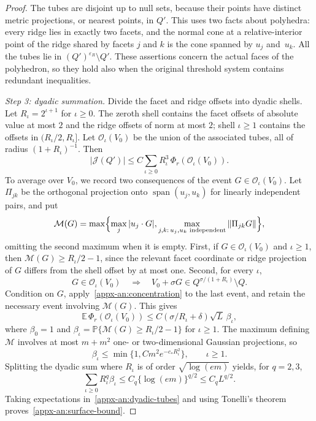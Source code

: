 \documentclass[11pt,letterpaper]{article}
\newif\ifshowrev
\newenvironment{revblock}{\ifshowrev\color{revblue}%
\hypersetup{linkcolor=revblue,citecolor=revblue,urlcolor=revblue}\fi}{}
\newif\ifshowpass
\newcommand{\pass}[1]{\ifshowpass{\color{revblue}%
\hypersetup{linkcolor=revblue,citecolor=revblue,urlcolor=revblue}#1}\else#1\fi}
\newif\ifshowskill
\newcommand{\sks}[1]{\ifshowskill{\color{revblue}#1}\else#1\fi}
\theoremstyle{remark}
\newcommand{\E}{\mathbb E}
\newcommand{\Pp}{\mathbb P}
\newcommand{\norm}[1]{\left\lVert#1\right\rVert}
\newcommand{\surf}{\mathcal J}
\begin{document}
\begin{revblock}
\begin{proof}
The tubes are disjoint up to null sets, because their points have
distinct metric projections, or nearest points, in \(Q'\). This uses two facts about
polyhedra: every ridge lies in exactly two facets, and the normal cone at
a relative-interior point of the ridge shared by facets \(j\) and \(k\) is
the cone spanned by \(u_j\) and~\(u_k\). All the tubes lie in
\((Q')^{\varepsilon_R}\setminus Q'\). These assertions concern the actual
faces of the polyhedron, so they \pass{hold also} when the original
threshold
system contains redundant inequalities.

\emph{Step 3: dyadic summation.} Divide the facet and ridge offsets into
dyadic shells. Let \(R_{\sks{\iota}}=2^{\sks{\iota}+1}\) for \(\sks{\iota}\ge0\). The zeroth shell
contains the facet offsets of absolute value at most \(2\) and the ridge
offsets of norm at most \(2\); shell \(\sks{\iota}\ge1\) contains the offsets in
\((R_{\sks{\iota}}/2,R_{\sks{\iota}}]\). Let \(\mathcal O_{\sks{\iota}}(V_0)\) be the union of the
associated tubes, all of radius \((1+R_{\sks{\iota}})^{-1}\). Then
\begin{equation}
 |\surf(Q')|\le C\sum_{\sks{\iota}\ge0}R_{\sks{\iota}}^3\,
                         \Phi_r(\mathcal O_{\sks{\iota}}(V_0)).
 \label{appx-an:dyadic-tubes}
\end{equation}
To average over \(V_0\), we record two consequences of the event
\(G\in\mathcal O_{\sks{\iota}}(V_0)\). Let \(\Pi_{jk}\) be the orthogonal
projection onto \(\operatorname{span}(u_j,u_k)\) for linearly independent
pairs, and put
\[
 \mathcal M(G)=\max\Bigl\{\max_j|u_j\cdot G|,
   \max_{j,k:\,u_j,u_k\text{ independent}}\norm{\Pi_{jk}G}\Bigr\},
\]
omitting the second maximum when it is empty. First, if
\(G\in\mathcal O_{\sks{\iota}}(V_0)\) and \(\sks{\iota}\ge1\), then
\(\mathcal M(G)\ge R_{\sks{\iota}}/2-1\), since the relevant facet coordinate or
ridge projection of \(G\) differs from the shell offset by at most one.
Second, for every \(\sks{\iota}\),
\[
 G\in\mathcal O_{\sks{\iota}}(V_0)
 \quad\Longrightarrow\quad
 V_0+\sigma G\in Q^{\sigma/(1+R_{\sks{\iota}})}\setminus Q.
\]
Condition on \(G\), apply~\eqref{appx-an:concentration} to the last event,
and retain the necessary event involving \(\mathcal M(G)\). This gives
\[
 \E\,\Phi_r(\mathcal O_{\sks{\iota}}(V_0))
 \le C(\sigma/R_{\sks{\iota}}+\delta)\sqrt L\,\beta_{\sks{\iota}},
\]
where \(\beta_0=1\) and \(\beta_{\sks{\iota}}=\Pp\{\mathcal M(G)\ge R_{\sks{\iota}}/2-1\}\)
for \(\sks{\iota}\ge1\). The maximum defining \(\mathcal M\) involves at most
\(m+m^2\) one- or two-dimensional Gaussian projections, so
\[
 \beta_{\sks{\iota}}\le\min\{1,Cm^2e^{-c_*R_{\sks{\iota}}^2}\},\qquad \sks{\iota}\ge1.
\]
Splitting the dyadic sum where \(R_{\sks{\iota}}\) is of order
\(\sqrt{\log(em)}\) yields, for \(q=2,3\),
\[
 \sum_{\sks{\iota}\ge0}R_{\sks{\iota}}^q\beta_{\sks{\iota}}
 \le C_q\{\log(em)\}^{q/2}\le C_qL^{q/2}.
\]
Taking expectations in~\eqref{appx-an:dyadic-tubes} and using Tonelli's
theorem proves~\eqref{appx-an:surface-bound}.
\end{proof}


\end{revblock}
\end{document}

